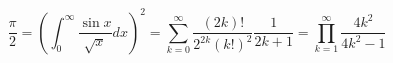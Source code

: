 \documentclass{jarticle}
\begin{document}
\[
  \frac{\pi}{2} =
  \left( \int_{0}^{\infty} \frac{\sin x}{\sqrt{x}} dx \right)^2 =
  \sum_{k=0}^{\infty} \frac{(2k)!}{2^{2k}(k!)^2} \frac{1}{2k+1} =
  \prod_{k=1}^{\infty} \frac{4k^2}{4k^2 - 1}
\]
\end{document}
